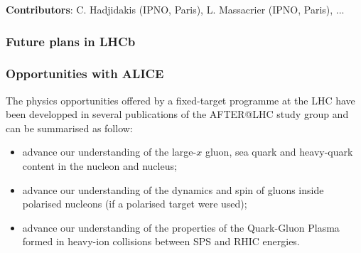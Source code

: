 \documentclass[../report.tex]{subfiles}
\begin{document}
\textbf{Contributors}: C. Hadjidakis (IPNO, Paris), L. Massacrier (IPNO, Paris), ... 

\subsubsection{Future plans in LHCb}


\subsubsection{Opportunities with ALICE}

The physics opportunities offered by a fixed-target programme at the LHC have been developped in several publications of the AFTER@LHC study group \cite{Brodsky:2012vg, Lansberg:Adv2015} and can be summarised as follow:
\begin{itemize}
\item advance our understanding of the large-$x$ gluon, sea quark and heavy-quark content in the nucleon and nucleus;
\item advance our understanding of the dynamics and spin of gluons inside polarised nucleons (if a polarised target were used);
\item advance our understanding of the properties of the Quark-Gluon Plasma formed in heavy-ion collisions between SPS and RHIC energies.
\end{itemize}
 
\end{document}
